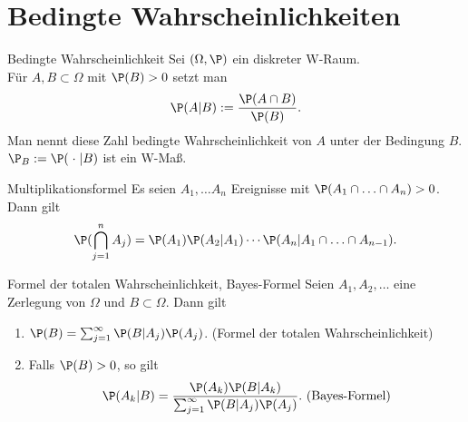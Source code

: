 \section*{Bedingte Wahrscheinlichkeiten}

\begin{karte}{Bedingte Wahrscheinlichkeit}
    Sei \( (\Omega, \P) \) ein diskreter W-Raum.\\
    Für \( A, B \subset \Omega \) mit \( \P(B) > 0 \) setzt man 
    \[ \P(A|B) := \frac{\P(A\cap B)}{\P(B)}. \]
    Man nennt diese Zahl bedingte Wahrscheinlichkeit von \(A\) 
    unter der Bedingung \(B\).\\
    \( \P_B := \P(\;\cdot\; | B) \) ist ein W-Maß.
\end{karte}

\begin{karte}{Multiplikationsformel}
    Es seien \( A_1, \ldots A_n \) Ereignisse mit 
    \( \P(A_1 \cap \ldots \cap A_n) > 0 \). 
    Dann gilt 
    \[ \P(\bigcap_{j=1}^n A_j) = \P(A_1) \P(A_2 | A_1) 
    \cdots \P(A_n | A_1 \cap\ldots \cap A_{n-1}). \]
\end{karte}

\begin{karte}{Formel der totalen Wahrscheinlichkeit, Bayes-Formel}
    Seien \( A_1, A_2, \ldots \) eine Zerlegung von \( \Omega \) 
    und \(B\subset \Omega\). Dann gilt 
    \begin{enumerate}
        \item \( \P(B) = \sum_{j=1}^\infty \P(B|A_j) \P(A_j) \). (Formel der totalen Wahrscheinlichkeit)
        \item Falls \( \P(B) > 0 \), so gilt 
        \[ \P(A_k | B) = \frac{ \P(A_k) \P(B | A_k) }{ \sum_{j=1}^\infty \P(B|A_j) \P(A_j) }. 
        \text{ (Bayes-Formel)} \]
    \end{enumerate}
\end{karte}